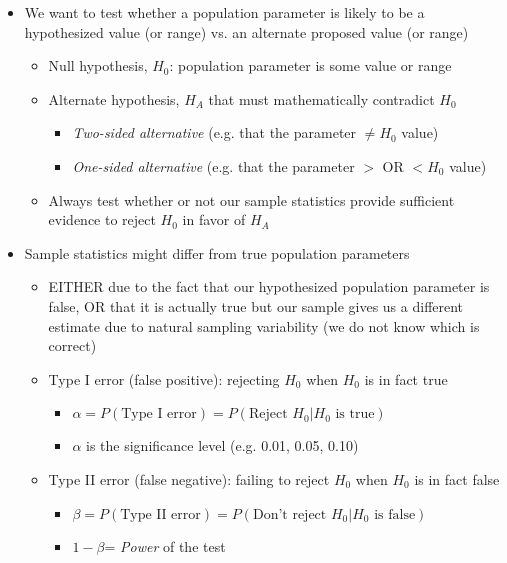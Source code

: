 \documentclass{article}
\begin{document}
\begin{itemize}
\begin{itemize}
	\item We want to test whether a population parameter is likely to be a hypothesized value (or range) vs. an alternate proposed value (or range)
	\begin{itemize}
			\item Null hypothesis, $H_0$: population parameter is some value or range
			\item Alternate hypothesis, $H_A$ that must mathematically contradict $H_0$
			\begin{itemize}
				\item \emph{Two-sided alternative} (e.g. that the parameter $\neq H_0$ value) 
				\item \emph{One-sided alternative} (e.g. that the parameter $>$ OR $< H_0$ value)
			\end{itemize}
			\item Always test whether or not our sample statistics provide sufficient evidence to reject $H_0$ in favor of $H_A$
	\end{itemize}
	\item Sample statistics might differ from true population parameters
	\begin{itemize}
		\item EITHER due to the fact that our hypothesized population parameter is false, OR that it is actually true but our sample gives us a different estimate due to natural sampling variability (we do not know which is correct)
		\item Type I error (false positive): rejecting $H_0$ when $H_0$ is in fact true
		\begin{itemize}
			\item $\alpha=P(\text{Type I error})=P(\text{Reject }H_0|H_0 \text{ is true})$
			\item $\alpha$ is the significance level (e.g. 0.01, 0.05, 0.10)
		\end{itemize} 
		\item Type II error (false negative): failing to reject $H_0$ when $H_0$ is in fact false 
		\begin{itemize}
			\item $\beta=P(\text{Type II error})=P(\text{Don't reject }H_0|H_0 \text{ is false})$
			\item $1-\beta$= \emph{Power} of the test 
		\end{itemize} 
			\begin{table}[h!]
			\centering 
		\begin{tabular}{ccc}

\end{tabular}
\end{table}
\end{itemize}
\end{itemize}
\end{itemize}
\end{document}
